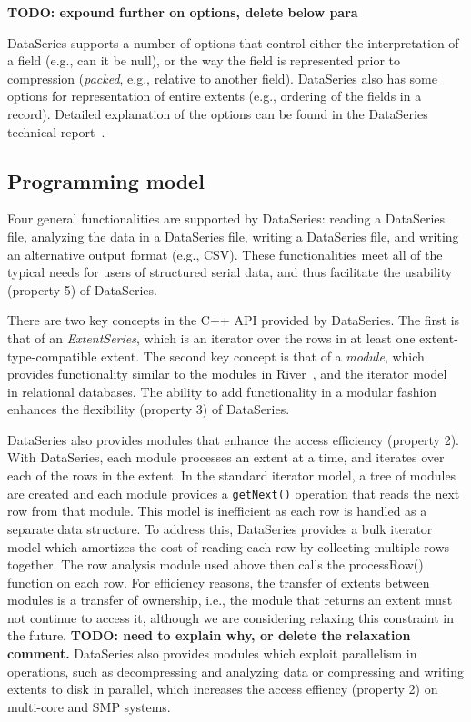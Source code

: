 \documentclass{acm_proc_article-sp}
\begin{document}
{\bf TODO: expound further on options, delete below para}

DataSeries supports a number of options that control either the
interpretation of a field (e.g., can it be null), or the way the field
is represented prior to compression ({\em packed}, e.g., relative to
another field).  DataSeries also has some options for representation
of entire extents (e.g., ordering of the fields in a record).  
Detailed explanation of the options can be found in the DataSeries
technical report~\cite{DSTechnicalReportSnapshot}.

\subsection{Programming model}
Four general functionalities are supported by DataSeries:
reading a DataSeries file, 
analyzing the data in a DataSeries file,
writing a DataSeries file,
and writing an alternative output format (e.g., CSV).
These functionalities meet all of the typical needs for
users of structured serial data, and thus facilitate
the usability (property 5) of DataSeries.

There are two key concepts in the C++ API provided by DataSeries. The
first is that of an \textit{ExtentSeries}, which is an iterator over
the rows in at least one extent-type-compatible extent.  
The second key concept is that of a \textit{module}, which provides
functionality similar to the modules in River~\cite{river99}, and the
iterator model~\cite{graefeQueryProcessing93} in relational databases.
The ability to add functionality in a modular fashion enhances
the flexibility (property 3) of DataSeries.

DataSeries also provides modules that enhance the access efficiency
(property 2).
With DataSeries, each module processes an extent at a time, and
iterates over each of the rows in the extent.  In the standard
iterator model, a tree of modules are created and each module provides
a {\tt getNext()} operation that reads the next row from that module.
This model is inefficient as each row is handled as a separate data
structure.  To address this, DataSeries provides a 
bulk iterator model which amortizes the cost of reading each
row by collecting multiple rows together.  The row analysis module
used above then calls the processRow() function on each row.  For
efficiency reasons, the transfer of extents between modules is a
transfer of ownership, i.e., the module that returns an extent must
not continue to access it, although we are considering relaxing this
constraint in the future.  
{\bf TODO: need to explain why, or delete the relaxation comment.}
DataSeries also provides modules which exploit parallelism in operations,
such as decompressing and analyzing data or compressing and writing
extents to disk in parallel, which increases the access effiency
(property 2) on multi-core and SMP systems.
\end{document}
